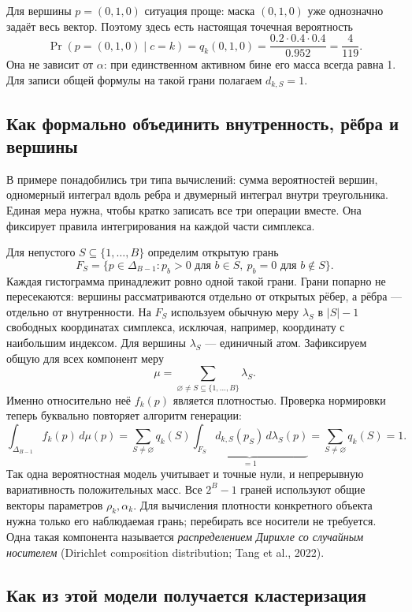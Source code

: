 \documentclass[11pt,a4paper]{article}
\begin{document}
Для вершины $p=(0,1,0)$ ситуация проще: маска $(0,1,0)$ уже однозначно
задаёт весь вектор. Поэтому здесь есть настоящая точечная вероятность
\[
 \Pr(p=(0,1,0)\mid c=k)
 =q_k(0,1,0)=\frac{0.2\cdot0.4\cdot0.4}{0.952}=\frac4{119}.
\]
Она не зависит от $\alpha$: при единственном активном бине его масса
всегда равна 1. Для записи общей формулы на такой грани полагаем $d_{k,S}=1$.

\subsection{Как формально объединить внутренность, рёбра и вершины}

В примере понадобились три типа вычислений: сумма вероятностей вершин,
одномерный интеграл вдоль ребра и двумерный интеграл внутри треугольника.
Единая мера нужна, чтобы кратко записать все три операции вместе.
Она фиксирует правила интегрирования на каждой части симплекса.

Для непустого $S\subseteq\{1,\ldots,B\}$ определим открытую грань
\[
 F_S=\{p\in\Delta_{B-1}:p_b>0\text{ для }b\in S,
                       \ p_b=0\text{ для }b\notin S\}.
\]
Каждая гистограмма принадлежит ровно одной такой грани.
Грани попарно не пересекаются: вершины рассматриваются отдельно от
открытых рёбер, а рёбра --- отдельно от внутренности.
На $F_S$ используем обычную меру $\lambda_S$ в $|S|-1$ свободных
координатах симплекса, исключая, например, координату с наибольшим индексом.
Для вершины $\lambda_S$ --- единичный атом.
Зафиксируем общую для всех компонент меру
\[
 \mu=\sum_{\varnothing\ne S\subseteq\{1,\ldots,B\}}\lambda_S.
\]
Именно относительно неё $f_k(p)$ является плотностью.
Проверка нормировки теперь буквально повторяет алгоритм генерации:
\[
 \int_{\Delta_{B-1}}f_k(p)\,d\mu(p)
 =\sum_{S\ne\varnothing}q_k(S)
     \underbrace{\int_{F_S}d_{k,S}(p_S)\,d\lambda_S(p)}_{=1}
 =\sum_{S\ne\varnothing}q_k(S)=1.
\]
Так одна вероятностная модель учитывает и точные нули, и непрерывную
вариативность положительных масс. Все $2^B-1$ граней используют общие
векторы параметров $\rho_k,\alpha_k$. Для вычисления плотности конкретного
объекта нужна только его наблюдаемая грань; перебирать все носители не требуется.
Одна такая компонента называется \emph{распределением Дирихле со случайным
носителем} (Dirichlet composition distribution; Tang et al., 2022).

\subsection{Как из этой модели получается кластеризация}
\end{document}
